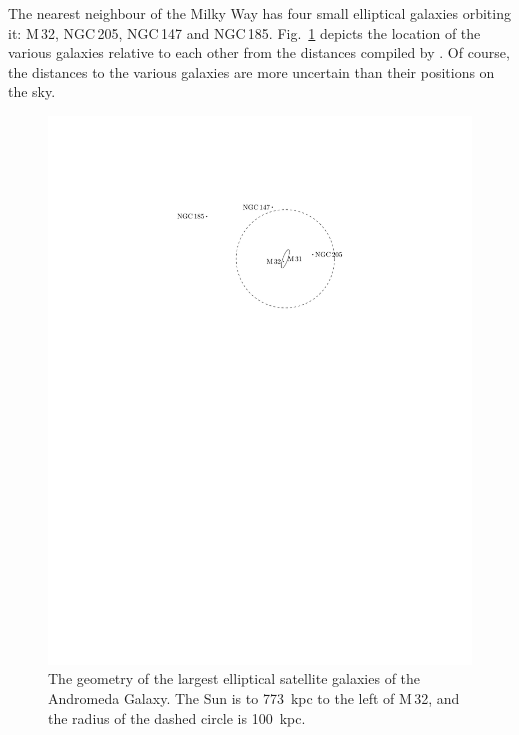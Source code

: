 \documentclass[useAMS,usenatbib]{mn2e}
\begin{document}
The nearest neighbour of the Milky Way has four small elliptical
galaxies orbiting it: M\,32, NGC\,205, NGC\,147 and NGC\,185.
Fig.~\ref{fig:M31-system} depicts the location of the various galaxies
relative to each other from the distances compiled by
\citet{2006AJ....131.1405K}.  Of course, the distances to the various
galaxies are more uncertain than their positions on the sky.
\begin{figure}
  \includegraphics[width=\columnwidth,clip,trim=2.5in 7in 2.5in 1.7in]{m31}
  \caption{The geometry of the largest elliptical satellite galaxies
    of the Andromeda Galaxy. The Sun is to 773~kpc to the left of
    M\,32, and the radius of the dashed circle is 100~kpc.}
  \label{fig:M31-system}
\end{figure}
\end{document}

